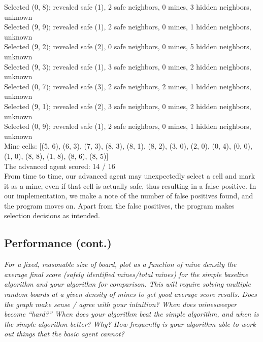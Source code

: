 \documentclass[11pt]{article} %
\begin{document}
Selected (0, 8); revealed safe (1), 2 safe neighbors, 0 mines, 3 hidden neighbors, unknown\\
Selected (9, 9); revealed safe (1), 2 safe neighbors, 0 mines, 1 hidden neighbors, unknown\\
Selected (9, 2); revealed safe (2), 0 safe neighbors, 0 mines, 5 hidden neighbors, unknown\\
Selected (9, 3); revealed safe (1), 3 safe neighbors, 0 mines, 2 hidden neighbors, unknown\\
Selected (0, 7); revealed safe (3), 2 safe neighbors, 2 mines, 1 hidden neighbors, unknown\\
Selected (9, 1); revealed safe (2), 3 safe neighbors, 0 mines, 2 hidden neighbors, unknown\\
Selected (0, 9); revealed safe (1), 2 safe neighbors, 0 mines, 1 hidden neighbors, unknown\\
Mine cells: [(5, 6), (6, 3), (7, 3), (8, 3), (8, 1), (8, 2), (3, 0), (2, 0), (0, 4), (0, 0), (1, 0), (8, 8), (1, 8), (8, 6), (8, 5)]\\
The advanced agent scored: 14 / 16\\

From time to time, our advanced agent may unexpectedly select a cell and mark it as a mine, even if that cell is actually safe, thus resulting in a false positive. In our implementation, we make a note of the number of false positives found, and the program moves on. Apart from the false positives, the program makes selection decisions as intended.\\

\subsection{Performance (cont.)}

\textit{For a fixed, reasonable size of board, plot as a function of mine density the average final score (safely identified mines/total mines) for the simple baseline algorithm and your algorithm for comparison. This will require solving multiple random boards at a given density of mines to get good average score results. Does the graph make sense / agree with your intuition? When does minesweeper become “hard?” When does your algorithm beat the simple algorithm, and when is the simple algorithm better? Why? How frequently is your algorithm able to work out things that the basic agent cannot?}\\
\end{document}
